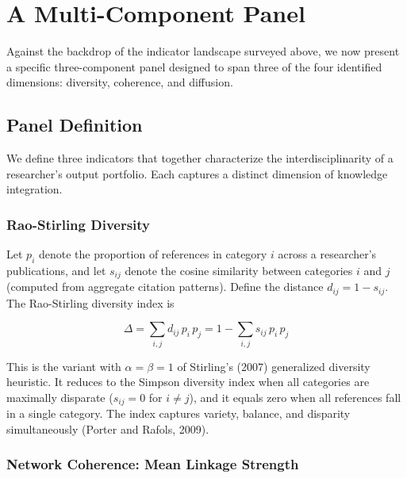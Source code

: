 \documentclass[
]{article}
\begin{document}
\hypertarget{a-multi-component-panel}{%
\section{A Multi-Component Panel}\label{a-multi-component-panel}}

Against the backdrop of the indicator landscape surveyed above, we now
present a specific three-component panel designed to span three of the
four identified dimensions: diversity, coherence, and diffusion.

\hypertarget{panel-definition}{%
\subsection{Panel Definition}\label{panel-definition}}

We define three indicators that together characterize the
interdisciplinarity of a researcher's output portfolio. Each captures a
distinct dimension of knowledge integration.

\hypertarget{rao-stirling-diversity}{%
\subsubsection{Rao-Stirling Diversity}\label{rao-stirling-diversity}}

Let \(p_i\) denote the proportion of references in category \(i\) across
a researcher's publications, and let \(s_{ij}\) denote the cosine
similarity between categories \(i\) and \(j\) (computed from aggregate
citation patterns). Define the distance \(d_{ij} = 1 - s_{ij}\). The
Rao-Stirling diversity index is

\[\Delta = \sum_{i,j} d_{ij}\, p_i \, p_j = 1 - \sum_{i,j} s_{ij}\, p_i \, p_j\]

This is the variant with \(\alpha = \beta = 1\) of Stirling's (2007)
generalized diversity heuristic. It reduces to the Simpson diversity
index when all categories are maximally disparate (\(s_{ij} = 0\) for
\(i \neq j\)), and it equals zero when all references fall in a single
category. The index captures variety, balance, and disparity
simultaneously (Porter and Rafols, 2009).

\hypertarget{network-coherence-mean-linkage-strength}{%
\subsubsection{Network Coherence: Mean Linkage
Strength}\label{network-coherence-mean-linkage-strength}}
\end{document}

